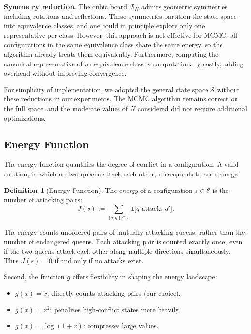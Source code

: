 \documentclass[10pt,twocolumn,a4paper]{article}
\newcommand{\statespace}{\mathcal{S}}
\newcommand{\board}{\mathcal{B}}
\theoremstyle{definition}
\newtheorem{definition}{Definition}[section]
\theoremstyle{remark}
\begin{document}
\textbf{Symmetry reduction.} The cubic board $\board_N$ admits geometric symmetries including rotations and reflections. These symmetries partition the state space into equivalence classes, and one could in principle explore only one representative per class. However, this approach is not effective for MCMC: all configurations in the same equivalence class share the same energy, so the algorithm already treats them equivalently. Furthermore, computing the canonical representative of an equivalence class is computationally costly, adding overhead without improving convergence.

For simplicity of implementation, we adopted the general state space $\statespace$ without these reductions in our experiments. The MCMC algorithm remains correct on the full space, and the moderate values of $N$ considered did not require additional optimizations.

\subsection{Energy Function}\label{subsec:energy}
The energy function quantifies the degree of conflict in a configuration. A valid solution, in which no two queens attack each other, corresponds to zero energy.

\begin{definition}[Energy Function]\label{def:energy}
The \emph{energy} of a configuration $s\in\statespace$ is the number of attacking pairs:
\begin{equation}
J(s):=\sum_{\{q,q'\}\subseteq s}\mathbf{1}\bigl[q\text{ attacks }q'\bigr].
\end{equation}
\end{definition}
The energy counts unordered pairs of mutually attacking queens, rather than the number of endangered queens. Each attacking pair is counted exactly once, even if the two queens attack each other along multiple directions simultaneously. Thus $J(s)=0$ if and only if no attacks exist.

Second, the function $g$ offers flexibility in shaping the energy landscape:
\begin{itemize}[leftmargin=*]
\item $g(x)=x$: directly counts attacking pairs (our choice).
\item $g(x)=x^2$: penalizes high-conflict states more heavily.
\item $g(x)=\log(1+x)$: compresses large values.
\end{itemize}
\end{document}
